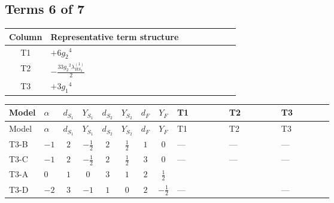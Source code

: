 \documentclass[8pt]{article}
\begin{document}
\begin{landscape}
\subsection*{Terms 6 of 7}
\begin{center}
\begin{tabular}{@{}c >{\raggedright\arraybackslash}p{0.82\linewidth}@{}}
\toprule
Column & Representative term structure \\
\midrule
T1 & \(\displaystyle +6 {g_2}^4\) \\
\midrule
T2 & \(\displaystyle -\frac{33 {g_2}^2 {\lambda_{HS_2}^{(1)}}}{2}\) \\
\midrule
T3 & \(\displaystyle +3 {g_1}^4\) \\
\midrule
\bottomrule
\end{tabular}
\end{center}
\smallskip
\tiny
\begin{longtable}{@{}llcccccc >{\raggedright\arraybackslash}p{0.21\linewidth} >{\raggedright\arraybackslash}p{0.21\linewidth} >{\raggedright\arraybackslash}p{0.21\linewidth}@{}}
\toprule
Model & $\alpha$ & $d_{S_1}$ & $Y_{S_1}$ & $d_{S_2}$ & $Y_{S_2}$ & $d_F$ & $Y_F$ & T1 & T2 & T3 \\
\midrule
\endfirsthead
\toprule
Model & $\alpha$ & $d_{S_1}$ & $Y_{S_1}$ & $d_{S_2}$ & $Y_{S_2}$ & $d_F$ & $Y_F$ & T1 & T2 & T3 \\
\midrule
\endhead
T3-B & $-1$ & $2$ & $-\frac{1}{2}$ & $2$ & $\frac{1}{2}$ & $1$ & $0$ & --- & --- & --- \\
\midrule
T3-C & $-1$ & $2$ & $-\frac{1}{2}$ & $2$ & $\frac{1}{2}$ & $3$ & $0$ & --- & --- & --- \\
\midrule
T3-A & $0$ & $1$ & $0$ & $3$ & $1$ & $2$ & $\frac{1}{2}$ & \scriptsize\adjustbox{max width=\linewidth}{$\begin{gathered} +6 {g_2}^4\end{gathered}$} & \scriptsize\adjustbox{max width=\linewidth}{$\begin{gathered} -\frac{33 {g_2}^2 {\lambda_{HS_2}^{(1)}}}{2}\end{gathered}$} & \scriptsize\adjustbox{max width=\linewidth}{$\begin{gathered} +3 {g_1}^4\end{gathered}$} \\
\midrule
T3-D & $-2$ & $3$ & $-1$ & $1$ & $0$ & $2$ & $-\frac{1}{2}$ & --- & \scriptsize\adjustbox{max width=\linewidth}{$\begin{gathered} -\frac{9 {g_2}^2 {\lambda_{HS_2}^{(1)}}}{2}\end{gathered}$} & --- \\

\end{longtable}
\end{landscape}
\end{document}
